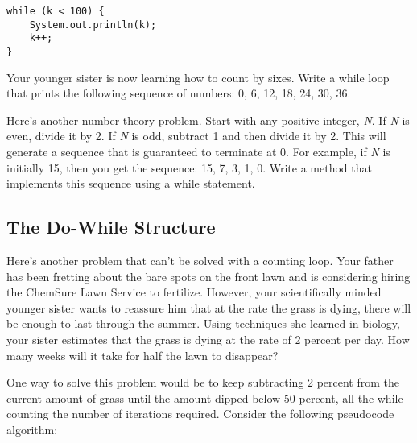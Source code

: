 \begin{SSTUDY}
\begin{EXRLL}
\begin{jjjlisting}
\begin{lstlisting}
while (k < 100) {
    System.out.println(k);
    k++;
}
\end{lstlisting}
\end{jjjlisting}
\end{EXRLL}


\item  Your younger sister is now learning how to count by sixes. Write a
while loop that prints the following sequence of numbers: 0, 6, 12,
18, 24, 30, 36.

\item  Here's another number theory 
problem. Start with any positive integer, {\it N}.  If {\it N} is
even, divide it by 2. If {\it N} is odd, subtract 1 and then divide it
by 2. This will generate a sequence that is guaranteed to terminate at
0.  For example, if {\it N} is initially 15, then you get the
sequence: 15, 7, 3, 1, 0. Write a method that implements this
sequence using a while statement.

\end{SSTUDY}

\subsection{The \mbox{Do-While} Structure}
\noindent Here's another problem that can't be solved with a counting loop. Your
father has been fretting about the bare spots on the front lawn and is
considering hiring the ChemSure Lawn Service to fertilize.  However,
your scientifically minded younger sister wants to reassure him that
at the rate the grass is dying, there will be enough to last through
the summer. Using techniques she learned in biology, your sister
estimates that the grass is dying at the rate of 2 percent per day. How
many weeks will it take for half the lawn to disappear?

One way to solve this problem would be to keep subtracting 2 percent from the
current amount of grass until the amount dipped below 50 percent, all
the while counting the number of iterations required. Consider
the following pseudocode algorithm:

